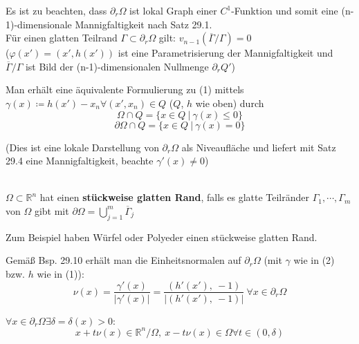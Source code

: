 Es ist zu beachten, dass $\partial_r \Omega $ ist lokal Graph einer
$C^1$-Funktion und somit eine (n-1)-dimensionale Mannigfaltigkeit nach Satz 29.1. \\
Für einen glatten Teilrand $\Gamma \subset \partial_r \Omega $ gilt:
$v_{n-1} \left(\overline{\Gamma} / \Gamma \right) = 0 $\\
($\varphi \left(x' \right) = \left(x', h\left(x' \right) \right)
$ ist eine Parametrisierung der Mannigfaltigkeit und \\
$\overline{\Gamma} / \Gamma 
$ ist Bild der (n-1)-dimensionalen Nullmenge $
\partial_r Q' $)

Man erhält eine äquivalente Formulierung zu (1) mittels \\
$\gamma(x) \coloneqq h(x') - x_n \forall (x', x_n) \in Q $ ($Q$, $h$ wie oben) durch
\begin{equation*}
    \Omega \cap Q = \lbrace x \in Q \ |\ \gamma(x) \leq 0 \rbrace
\end{equation*}
\begin{equation}
    \partial \Omega \cap Q = \lbrace x \in Q \ |\ \gamma(x) = 0 \rbrace
\end{equation}

(Dies ist eine lokale Darstellung von $\partial_r \Omega $ als Niveaufläche
und liefert mit Satz 29.4 eine Mannigfaltigkeit, beachte $\gamma'(x) \neq 0 $)

\begin{definition}
    \mbox{} \\
    $\Omega \subset \mathbb{R}^n $ hat einen \textbf{stückweise glatten Rand}, 
    falls es glatte Teilränder $\Gamma_1, \cdots, \Gamma_m $ von $\Omega$ gibt mit
    $\partial \Omega = \bigcup\limits_{j=1}^m \overline{\Gamma}_j $
\end{definition}

Zum Beispiel haben Würfel oder Polyeder einen stückweise glatten Rand.

Gemäß Bsp. 29.10 erhält man die Einheitsnormalen auf $\partial_r \Omega $
(mit $\gamma$ wie in (2) bzw. $h$ wie in (1)): \\

\begin{equation}
    \nu(x) = 
    \frac{\gamma'(x)}{|\gamma'(x)|} = 
    \frac{(h'(x'),\ -1)}{|(h'(x'),\ -1)|} \
    \forall x \in \partial_r \Omega
\end{equation}

\begin{lemma}
$\forall x \in \partial_r \Omega \exists \delta = \delta(x) > 0$:
\begin{equation}
    x + t \nu(x) \in \mathbb{R}^n / \Omega, \ x - t \nu(x) \in \Omega
    \forall t \in (0, \delta)
\end{equation}
\end{lemma}

